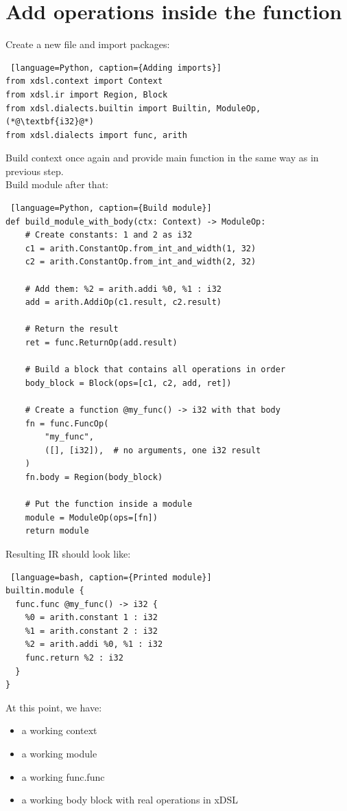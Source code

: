 \documentclass[../main.tex]{subfiles}
\begin{document}
\section{Add operations inside the function}
Create a new file  and import packages: 
\begin{lstlisting} [language=Python, caption={Adding imports}]
from xdsl.context import Context
from xdsl.ir import Region, Block
from xdsl.dialects.builtin import Builtin, ModuleOp, (*@\textbf{i32}@*)
from xdsl.dialects import func, arith
\end{lstlisting}

Build context once again and provide main function in the same way as in previous step.
\\Build module after that:
\begin{lstlisting} [language=Python, caption={Build module}]
def build_module_with_body(ctx: Context) -> ModuleOp:
    # Create constants: 1 and 2 as i32
    c1 = arith.ConstantOp.from_int_and_width(1, 32)
    c2 = arith.ConstantOp.from_int_and_width(2, 32)

    # Add them: %2 = arith.addi %0, %1 : i32
    add = arith.AddiOp(c1.result, c2.result)

    # Return the result
    ret = func.ReturnOp(add.result)

    # Build a block that contains all operations in order
    body_block = Block(ops=[c1, c2, add, ret])

    # Create a function @my_func() -> i32 with that body
    fn = func.FuncOp(
        "my_func",
        ([], [i32]),  # no arguments, one i32 result
    )
    fn.body = Region(body_block)

    # Put the function inside a module
    module = ModuleOp(ops=[fn])
    return module
\end{lstlisting}
Resulting IR should look like:
\begin{lstlisting} [language=bash, caption={Printed module}]
builtin.module {
  func.func @my_func() -> i32 {
    %0 = arith.constant 1 : i32
    %1 = arith.constant 2 : i32
    %2 = arith.addi %0, %1 : i32
    func.return %2 : i32
  }
}
\end{lstlisting}
At this point, we have:
\begin{itemize}
    \item a working context
    \item a working module
    \item a working func.func
    \item a working body block with real operations in xDSL
\end{itemize}
\end{document}
